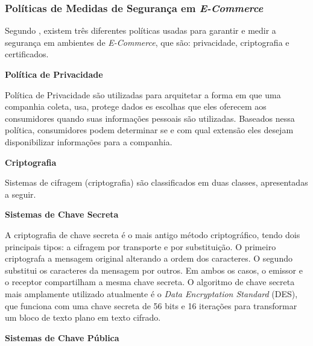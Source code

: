 \subsubsection{Políticas de Medidas de Segurança em \textit{E-Commerce}}

Segundo \cite{al2008commerce}, existem três diferentes políticas usadas para garantir e medir a segurança em ambientes de \textit{E-Commerce}, que são: privacidade, criptografia e certificados.

\textbf{Política de Privacidade}

Política de Privacidade são utilizadas para arquitetar a forma em que uma companhia coleta, usa, protege dados es escolhas que eles oferecem aos consumidores quando suas informações pessoais são utilizadas. Baseados nessa política, consumidores podem determinar se e com qual extensão eles desejam disponibilizar informações para a companhia.

\textbf{Criptografia}

Sistemas de cifragem (criptografia) são classificados em duas classes, apresentadas a seguir.


\textbf{Sistemas de Chave Secreta}

A criptografia de chave secreta é o mais antigo método criptográfico, tendo dois principais tipos: a cifragem por transporte e por substituição. O primeiro criptografa a mensagem original alterando a ordem dos caracteres. O segundo substitui os caracteres da mensagem por outros. Em ambos os casos, o emissor e o receptor compartilham a mesma chave secreta. O algoritmo de chave secreta mais amplamente utilizado atualmente é o \textit{Data Encryptation Standard} (DES), que funciona com uma chave secreta de 56 bits e 16 iterações para transformar um bloco de texto plano em texto cifrado.

\textbf{Sistemas de Chave Pública}

